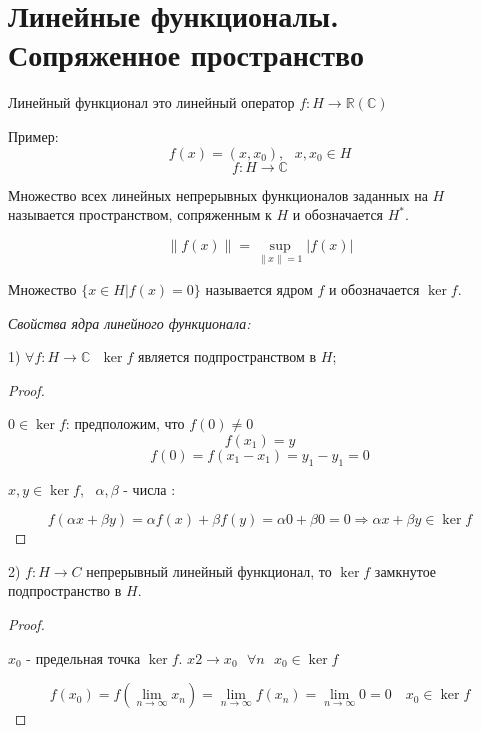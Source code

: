 \documentclass[12pt, a4paper]{report}
\begin{document}
\fi


\section{Линейные функционалы. Сопряженное пространство}

\begin{definition}
    Линейный функционал это линейный оператор \( f: H \to  \mathbb{R}(\mathbb{C}) \) 
\end{definition}

Пример:
\[ f(x )= ( x, x_0), \text{ }  x, x_0 \in H \]  
\[ f: H \to  \mathbb{C} \] 

\begin{definition}
    Множество всех линейных непрерывных функционалов заданных на \( H \)  называется пространством, сопряженным к \( H \)  и обозначается \( H^* \).
\end{definition}

\[ \left\lVert f(x) \right\rVert = \sup _{\left\lVert x  \right\rVert =1} \left\lvert f(x ) \right\rvert  \] 

\begin{definition}
    Множество  \( \{x \in  H | f(x )= 0\} \) называется ядром \( f \)  и обозначается \( \ker f \).
\end{definition}

\textit{Свойства ядра линейного функционала:} 

1) \( \forall  f :  H \to  \mathbb{C}  \text{ }  \ker f \) является подпространством в \( H \);

\begin{proof} \(  \) 

    \( 0 \in \ker   f \): предположим, что \( f(0 ) \neq 0 \) 
    \[ f(x_1 ) = y  \]  
    \[ f(0 ) = f(x_1 -x_1 ) = y_1 - y_1 = 0  \] 

    \(x,y \in  \ker  f , \text{ }  \alpha , \beta  \text{ - числа }   \):

    \[  f(\alpha x + \beta y )= \alpha f (x ) + \beta f( y ) = \alpha 0 + \beta 0 = 0 \Rightarrow \alpha x + \beta y \in  \ker f\] 

\end{proof}

2) \( f : H \to C  \)  непрерывный линейный функционал, то \( \ker  f \)  замкнутое подпространство в \( H \).

\begin{proof} \(  \) 

    \( x_0 \) - предельная точка \( \ker f \). \( x 2 \to  x_0 \text{ }  \forall  n \text{ }  x_0 \in  \ker f \) 

    \[ f(x_0) = f \left( \lim_{n \to \infty}  x_n \right) = \lim_{n  \to \infty} f(x_n ) = \lim_{n         \to \infty} 0 = 0 \quad   x_0 \in \ker   f \] 

\end{proof}
\end{document}
